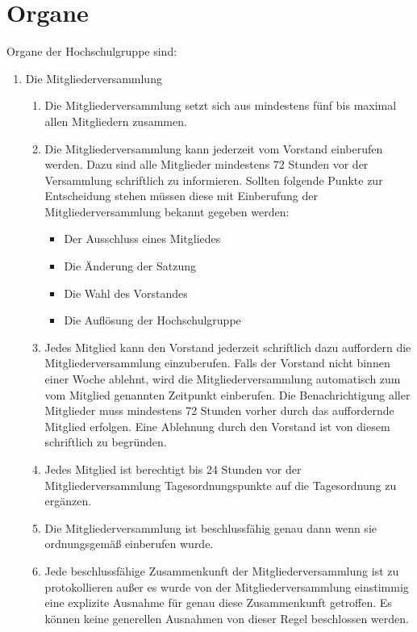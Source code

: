 \documentclass[11pt]{article}
\begin{document}
	\section{Organe}
	Organe der Hochschulgruppe sind:
	\begin{enumerate}
		\item Die Mitgliederversammlung
		\begin{enumerate}
			\item Die Mitgliederversammlung setzt sich aus mindestens fünf bis maximal allen Mitgliedern zusammen.
			\item Die Mitgliederversammlung kann jederzeit vom Vorstand einberufen werden. Dazu sind alle Mitglieder mindestens 72 Stunden vor der Versammlung schriftlich zu informieren. Sollten folgende Punkte zur Entscheidung stehen müssen diese mit Einberufung der Mitgliederversammlung bekannt gegeben werden:
            \begin{itemize}
                \item Der Ausschluss eines Mitgliedes
                \item Die Änderung der Satzung
                \item Die Wahl des Vorstandes
                \item Die Auflösung der Hochschulgruppe
            \end{itemize}
			\item Jedes Mitglied kann den Vorstand jederzeit schriftlich dazu auffordern die Mitgliederversammlung einzuberufen. Falls der Vorstand nicht binnen einer Woche ablehnt, wird die Mitgliederversammlung automatisch zum vom Mitglied genannten Zeitpunkt einberufen. Die Benachrichtigung aller Mitglieder muss mindestens 72 Stunden vorher durch das auffordernde Mitglied erfolgen. Eine Ablehnung durch den Vorstand ist von diesem schriftlich zu begründen.
            \item Jedes Mitglied ist berechtigt bis 24 Stunden vor der Mitgliederversammlung Tagesordnungspunkte auf die Tagesordnung zu ergänzen.
			\item Die Mitgliederversammlung ist beschlussfähig genau dann wenn sie ordnungsgemäß einberufen wurde.
			\item Jede beschlussfähige Zusammenkunft der Mitgliederversammlung ist zu protokollieren außer es wurde von der Mitgliederversammlung einstimmig eine explizite Ausnahme für genau diese Zusammenkunft getroffen. Es können keine generellen Ausnahmen von dieser Regel beschlossen werden.
            \begin{itemize}

\end{itemize}
\end{enumerate}
\end{enumerate}
\end{document}
